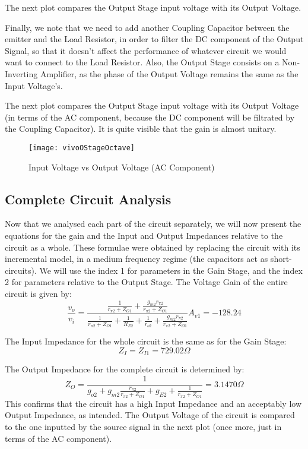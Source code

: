 The next plot compares the Output Stage input voltage with its Output Voltage.

Finally, we note that we need to add another Coupling Capacitor between the emitter and the Load Resistor, in order to filter the DC component of the Output Signal, so that it doesn't affect the performance of whatever circuit we would want to connect to the Load Resistor. Also, the Output Stage consists on a Non-Inverting Amplifier, as the phase of the Output Voltage remains the same as the Input Voltage's.

The next plot compares the Output Stage input voltage with its Output Voltage (in terms of the AC component, because the DC component will be filtrated by the Coupling Capacitor). It is quite visible that the gain is almost unitary.

\FloatBarrier
\begin{figure}[ht] \centering
\texttt{[image: vivoOStageOctave]}
\caption{Input Voltage vs Output Voltage (AC Component)}
\label{fig:vivoOS}
\end{figure} 
\FloatBarrier

\subsection{Complete Circuit Analysis}

Now that we analysed each part of the circuit separately, we will now present the equations for the gain and the Input and Output Impedances relative to the circuit as a whole. These formulae were obtained by replacing the circuit with its incremental model, in a medium frequency regime (the capacitors act as short-circuits). We will use the index 1 for parameters in the Gain Stage, and the index 2 for parameters relative to the Output Stage.
The Voltage Gain of the entire circuit is given by:
\begin{equation}
\frac{v_o}{v_i} = \frac{\frac{1}{r_{\pi2} + Z_{O1}} + \frac{g_{m2} r_{\pi2}}{r_{\pi2} + Z_{O1}}}{\frac{1}{r_{\pi2} + Z_{O1}} + \frac{1}{R_{E2}} + \frac{1}{r_{o2}} + \frac{g_{m2} r_{\pi2}}{r_{\pi2} + Z_{O1}}} A_{v1} = -128.24
\label{eq:gainTotal}
\end{equation}

The Input Impedance for the whole circuit is the same as for the Gain Stage:
\begin{equation}
Z_I = Z_{I1} = 729.02 \Omega
\label{eq:InputImpTotal}
\end{equation}

The Output Impedance for the complete circuit is determined by:
\begin{equation}
Z_O = \frac{1}{g_{o2} + g_{m2} \frac{r_{\pi2}}{r_{\pi2} + Z_{O1}} + g_{E2} + \frac{1}{r_{\pi2} + Z_{O1}}} = 3.1470 \Omega
\label{eq:OutputImpTotal}
\end{equation}
This confirms that the circuit has a high Input Impedance and an acceptably low Output Impedance, as intended.
The Output Voltage of the circuit is compared to the one inputted by the source signal in the next plot (once more, just in terms of the AC component).

